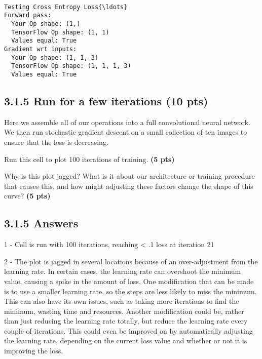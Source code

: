\documentclass[11pt]{article}
\begin{document}
    \begin{Verbatim}[commandchars=\\\{\}]

Testing Cross Entropy Loss{\ldots}
Forward pass:
  Your Op shape: (1,)
  TensorFlow Op shape: (1, 1)
  Values equal: True
Gradient wrt inputs:
  Your Op shape: (1, 1, 3)
  TensorFlow Op shape: (1, 1, 1, 3)
  Values equal: True

    \end{Verbatim}

    \subsection{3.1.5 Run for a few iterations (10
pts)}\label{run-for-a-few-iterations-10-pts}

Here we assemble all of our operations into a full convolutional neural
network. We then run stochastic gradient descent on a small collection
of ten images to ensure that the loss is decreasing.

Run this cell to plot 100 iterations of training. \textbf{(5 pts)}

Why is this plot jagged? What is it about our architecture or training
procedure that causes this, and how might adjusting these factors change
the shape of this curve? \textbf{(5 pts)}

\subsection{3.1.5 Answers}\label{answers}

1 - Cell is run with 100 iterations, reaching \textless{} .1 loss at
iteration 21

2 - The plot is jagged in several locations because of an
over-adjustment from the learning rate. In certain cases, the learning
rate can overshoot the minimum value, causing a spike in the amount of
loss. One modification that can be made is to use a smaller learning
rate, so the steps are less likely to miss the minimum. This can also
have its own issues, such as taking more iterations to find the minimum,
wasting time and resources. Another modification could be, rather than
just reducing the learning rate totally, but reduce the learning rate
every couple of iterations. This could even be improved on by
automatically adjusting the learning rate, depending on the current loss
value and whether or not it is improving the loss.
\end{document}
